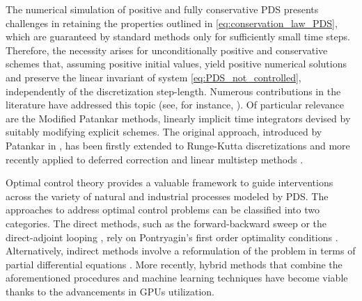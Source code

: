 \documentclass[10pt]{article}
\theoremstyle{remark}
\theoremstyle{definition}
\theoremstyle{remark}
\begin{document}
The numerical simulation of positive and fully conservative PDS presents challenges in retaining the properties outlined in \eqref{eq:conservation_law_PDS}, which are guaranteed by standard methods only for sufficiently small time steps. Therefore, the necessity arises for unconditionally positive and conservative schemes that, assuming positive initial values, yield positive numerical solutions and preserve the linear invariant of system \eqref{eq:PDS_not_controlled}, independently of the discretization step-length. Numerous contributions in the literature have addressed this topic (see, for instance, \cite{Dimitrov1,Dimitrov2,GECO1,GECO2,Formaggia_Scotti}). Of particular relevance are the Modified Patankar methods, linearly implicit time integrators devised by suitably modifying explicit schemes. The original approach, introduced by Patankar in \cite{patankar1980numerical}, has been firstly extended to Runge-Kutta discretizations \cite{MPEuler,Kopecz2018,Kopecz2018second,Kopecz2019,Huang2019,Huang2019II,Izgin3,Izgin1,IzginSSPMPRK,Izgin2} and more recently applied to deferred correction \cite{TORLO2022,Torlo2020} and linear multistep \cite{MPLM,Zhu2024} methods . 

Optimal control theory provides a valuable framework to guide interventions across the variety of natural and industrial processes modeled by PDS. The approaches to address optimal control problems can be classified into two categories. The direct methods, such as the forward-backward sweep or the direct-adjoint looping \cite{MMH12}, rely on Pontryagin's first order optimality conditions \cite{BGP56}. Alternatively, indirect methods involve a reformulation of the problem in terms of partial differential equations \cite{BardiCapuzzoDocetta2008,FalconeFerretti}. More recently, hybrid methods that combine the aforementioned procedures \cite{CM10,AKK21,Cacace_Oliviero} and machine learning techniques \cite{SSGK23} have become viable thanks to the advancements in GPUs utilization.
\end{document}
